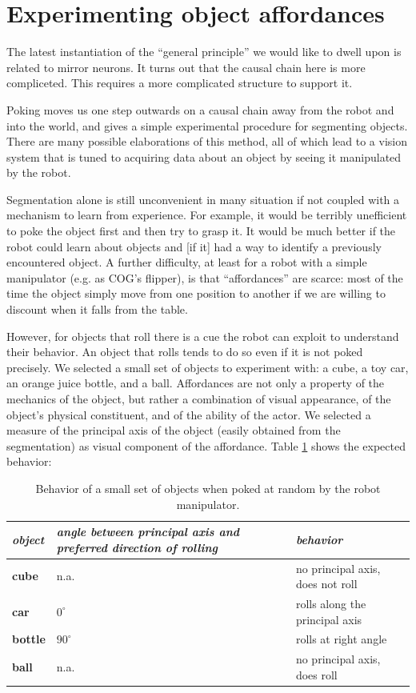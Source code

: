 
\section{Experimenting object affordances}

\ifverbose
The latest instantiation of the ``general principle'' we would like to
dwell upon is related to mirror neurons. It turns out that the causal
chain here is more compliceted. This requires a more complicated
structure to support it.
\fi

Poking moves us one step outwards on a causal chain away from the
robot and into the world, and gives a simple experimental procedure
for segmenting objects.  There are many possible elaborations of this
method, all of which lead to a vision system that is tuned to 
acquiring data about an object by seeing it manipulated by the robot.  

Segmentation alone is still unconvenient in many situation if not 
coupled with a mechanism to learn from experience. For example, it 
would be terribly unefficient to poke the object first and then try 
to grasp it. It would be much better if the robot could learn about
objects and [if it] had a way to identify a previously encountered object. 
A further difficulty, at least for a robot with a simple 
manipulator (e.g. as COG's flipper), is that ``affordances'' are scarce: 
most of the time the object simply move from one position
to another if we are willing to discount when it falls from the table.

However, for objects that roll there is a cue the robot can exploit
to understand their behavior. An object that rolls tends to do so even 
if it is not poked precisely. We selected a small set of objects to
experiment with: a cube, a toy car, an orange juice bottle, and a ball.
Affordances are not only a property of the mechanics of the object, but 
rather a combination of visual appearance, of the object's physical 
constituent, and of the ability of the actor. We selected a measure of
the principal axis of the object (easily obtained from the segmentation)
as visual component of the affordance. Table \ref{tab:affordances} shows the expected
behavior:

\begin{table}[htbp]
\begin{center}
\begin{tabular}{|p{3.5cm}|p{3.5cm}|p{3.5cm}|}
\hline
{\it object} & {\it angle between principal axis and preferred direction of rolling} &  {\it behavior} \\ \hline\hline
{\bf cube} & n.a. & no principal axis, does not roll\\ \hline
{\bf car} & $0^\circ$ & rolls along the principal axis\\ \hline
{\bf bottle} &  $90^\circ$ & rolls at right angle\\ \hline
{\bf ball} &  n.a. & no principal axis, does roll\\ \hline
\end{tabular}
\caption{
\label{tab:affordances}
%
Behavior of a small set of objects when poked at random by the robot manipulator.
%
}
\end{center}
\end{table}

